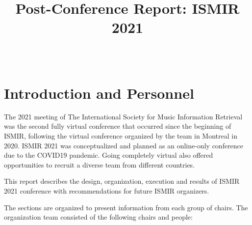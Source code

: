\documentclass[%
10pt,								%
]
{scrartcl}
\begin{document}
\pagestyle{empty} %


\title{Post-Conference Report: ISMIR 2021}
\author{~}
\maketitle 	
\tableofcontents		

\section{Introduction and Personnel}
    The 2021 meeting of The International Society for Music Information Retrieval was the second fully virtual conference that occurred since the beginning of ISMIR, following the virtual conference organized by the team in Montreal in 2020. ISMIR 2021 was conceptualized and planned as an online-only conference due to the COVID19 pandemic. Going completely virtual also offered opportunities to recruit a diverse team from different countries. 

    This report describes the design, organization, execution and results of ISMIR 2021 conference with recommendations for future ISMIR organizers.  

    The sections are organized to present information from each group of chairs. The organization team consisted of the following chairs and people:
\end{document}
